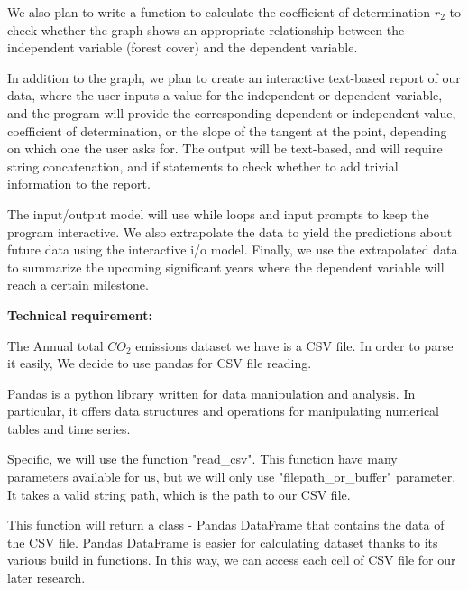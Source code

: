 \documentclass[12pt]{article}
\begin{document}
\begin{enumerate}
\begin{text}
We also plan to write a function to calculate the coefficient of determination \texttt{$r_2$} to check whether the graph shows an appropriate relationship between the independent variable (forest cover) and the dependent variable.

In addition to the graph, we plan to create an interactive text-based report of our data, where the user inputs a value for the independent or dependent variable, and the program will provide the corresponding dependent or independent value, coefficient of determination, or the slope of the tangent at the point, depending on which one the user asks for. The output will be text-based, and will require string concatenation, and if statements to check whether to add trivial information to the report.

The input/output model will use while loops and input prompts to keep the program interactive. We also extrapolate the data to yield the predictions about future data using the interactive i/o model. Finally, we use the extrapolated data to summarize the upcoming significant years where the dependent variable will reach a certain milestone.

\newpage

\textbf{Technical requirement:}

The Annual total $CO_2$ emissions dataset we have is a CSV file. In order to parse it easily, We decide to use pandas for CSV file reading.

Pandas is a python library written for data manipulation and analysis.
In particular, it offers data structures and operations for manipulating numerical tables and time series.

Specific, we will use the function "read\_csv". This function have many parameters available for us, but we will only use "filepath\_or\_buffer" parameter.
It takes a valid string path, which is the path to our CSV file.

This function will return a class - Pandas DataFrame that contains the data of the CSV file. Pandas DataFrame is easier for calculating dataset thanks to its various build in functions.
In this way, we can access each cell of CSV file for our later research.

\end{text}

\maketitle

\newpage




\end{enumerate}
\end{document}
